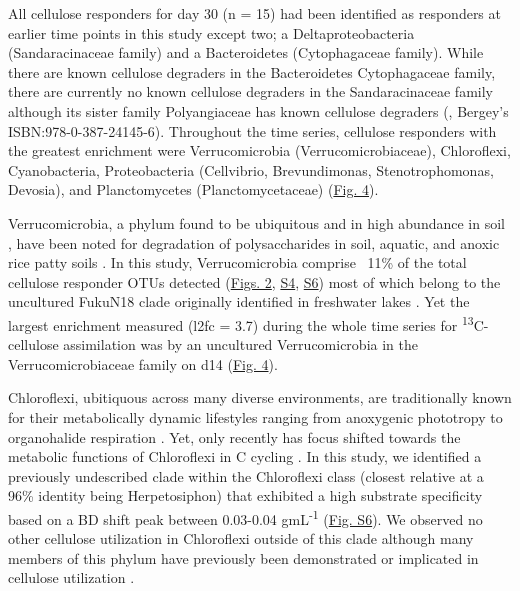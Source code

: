 All cellulose responders for day 30 (n = 15) had been identified as responders at earlier time points in this study except two; a Deltaproteobacteria (Sandaracinaceae family) and a Bacteroidetes (Cytophagaceae family). While there are known cellulose degraders in the Bacteroidetes Cytophagaceae family, there are currently no known cellulose degraders in the Sandaracinaceae family although its sister family Polyangiaceae has known cellulose degraders (\cite{Reichenbach_2006}, Bergey's ISBN:978-0-387-24145-6). Throughout the time series, cellulose responders with the greatest enrichment were Verrucomicrobia (Verrucomicrobiaceae), Chloroflexi, Cyanobacteria, Proteobacteria (Cellvibrio, Brevundimonas, Stenotrophomonas, Devosia), and Planctomycetes (Planctomycetaceae) (\href{https://authorea.com/users/3537/articles/3612/master/file/figures/bacteria_tree/bacteria_tree.png}{Fig. 4}).      

Verrucomicrobia, a phylum found to be ubiquitous and in high abundance in soil \cite{Fierer_2013}, have been noted for degradation of polysaccharides in soil, aquatic, and anoxic rice patty soils \cite{Fierer_2013,Herlemann_2013,10543821}. In this study, Verrucomicrobia comprise ~11\% of the total cellulose responder OTUs detected (\href{https://www.authorea.com/users/3537/articles/3612/master/file/figures/l2fc_fig1/l2fc_fig.pdf}{Figs. 2}, \href{https://authorea.com/users/3537/articles/8459/master/file/figures/l2fc_fig_pVal/l2fc_fig_pVal.png}{S4}, \href{https://authorea.com/users/3537/articles/8459/master/file/figures/cellulose_resp_profiles/cellulose_resp_profiles.png}{S6}) most of which belong to the uncultured FukuN18 clade originally identified in freshwater lakes \cite{Parveen_2013}. Yet the largest enrichment measured (l2fc = 3.7) during the whole time series for \textsuperscript{13}C-cellulose assimilation was by an uncultured Verrucomicrobia in the Verrucomicrobiaceae family on d14 (\href{https://authorea.com/users/3537/articles/3612/master/file/figures/bacteria_tree/bacteria_tree.png}{Fig. 4}). 

Chloroflexi, ubitiquous across many diverse environments, are traditionally known for their metabolically dynamic lifestyles ranging from anoxygenic phototropy to organohalide respiration \cite{Hug_2013}. Yet, only recently has focus shifted towards the metabolic functions of Chloroflexi in C cycling \cite{Hug_2013,Goldfarb_2011,Cole_2013}. In this study, we identified a previously undescribed clade within the Chloroflexi class (closest relative at a 96\% identity being Herpetosiphon) that exhibited a high substrate specificity based on a BD shift peak between 0.03-0.04 gmL\textsuperscript{-1} (\href{https://authorea.com/users/3537/articles/8459/master/file/figures/cellulose_resp_profiles/cellulose_resp_profiles.png}{Fig. S6}). We observed no other cellulose utilization in Chloroflexi outside of this clade although many members of this phylum have previously been demonstrated or implicated in cellulose utilization \cite{Goldfarb_2011,Cole_2013,Hug_2013}. 

